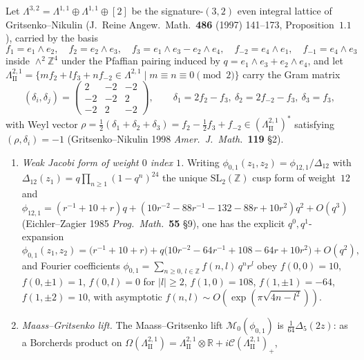 \begin{lemma}[Explicit Fourier data of \texorpdfstring{$\phi_{0,1}$}{phi-0,1}, imaginary-odd multiplicities \texorpdfstring{$m(a)$}{m(a)}, and the \texorpdfstring{$\tau(a_0)=9$}{tau(a-0)=9} cusp signature at the three \texorpdfstring{$0$}{0}-dimensional cusps]
\label{lem:k3e-cy3-phi01-tau9-multiplicities}
Let $\Lambda^{3,2} = \Lambda^{1,1}\oplus\Lambda^{1,1}\oplus[2]$ be the signature-$(3,2)$ even integral lattice of Gritsenko--Nikulin \textup{(}J.~Reine Angew.\ Math.~\textbf{486} (1997) 141--173, Proposition~$1.1$\textup{)}, carried by the basis
\[
 f_1 = e_1\wedge e_2,\quad f_2 = e_2\wedge e_3,\quad f_3 = e_1\wedge e_3 - e_2\wedge e_4,\quad f_{-2} = e_4\wedge e_1,\quad f_{-1} = e_4\wedge e_3
\]
inside $\wedge^2\mathbb Z^4$ under the Pfaffian pairing induced by $q = e_1\wedge e_3 + e_2\wedge e_4$, and let $\Lambda^{2,1}_{\mathrm{II}} = \{m f_2 + l f_3 + n f_{-2}\in\Lambda^{2,1}\mid m\equiv n\equiv 0\pmod 2\}$ carry the Gram matrix
\[
 (\delta_i,\delta_j) = \begin{pmatrix} 2 & -2 & -2\\ -2 & -2 & 2\\ -2 & 2 & -2\end{pmatrix},\qquad \delta_1 = 2f_2 - f_3,\ \delta_2 = 2f_{-2} - f_3,\ \delta_3 = f_3,
\]
with Weyl vector $\rho = \tfrac12(\delta_1+\delta_2+\delta_3) = f_2 - \tfrac12 f_3 + f_{-2}\in(\Lambda^{2,1}_{\mathrm{II}})^{*}$ satisfying $(\rho,\delta_i) = -1$ \textup{(}Gritsenko--Nikulin 1998 \emph{Amer.\ J.\ Math.}~\textbf{119} \S 2\textup{)}.
\begin{enumerate}[label=\textup{(\roman*)},leftmargin=1.5em]
\item \emph{Weak Jacobi form of weight $0$ index $1$.} Writing $\phi_{0,1}(z_1,z_2) = \phi_{12,1}/\Delta_{12}$ with $\Delta_{12}(z_1) = q\prod_{n\geq 1}(1-q^n)^{24}$ the unique $\mathrm{SL}_2(\mathbb Z)$ cusp form of weight~$12$ and $\phi_{12,1} = (r^{-1}+10+r)q + (10r^{-2} - 88r^{-1} - 132 - 88r + 10r^2)q^2 + O(q^3)$ \textup{(}Eichler--Zagier 1985 \emph{Prog.\ Math.}~\textbf{55} \S 9\textup{)}, one has the explicit $q^0,q^1$-expansion
\[
 \phi_{0,1}(z_1,z_2) = \bigl(r^{-1}+10+r\bigr) + q\bigl(10 r^{-2} - 64 r^{-1} + 108 - 64 r + 10 r^{2}\bigr) + O(q^2),
\]
and Fourier coefficients $\phi_{0,1} = \sum_{n\geq 0,\,l\in\mathbb Z}f(n,l)\,q^n r^l$ obey $f(0,0)=10$, $f(0,\pm 1)=1$, $f(0,l)=0$ for $|l|\geq 2$, $f(1,0)=108$, $f(1,\pm 1) = -64$, $f(1,\pm 2)=10$, with asymptotic $f(n,l)\sim O(\exp(\pi\sqrt{4n-l^2}))$.
\item \emph{Maass--Gritsenko lift.} The Maass--Gritsenko lift $\mathcal M_0(\phi_{0,1})$ is $\tfrac{1}{64}\Delta_5(2z)$: as a Borcherds product on $\Omega(\Lambda^{2,1}_{\mathrm{II}}) = \Lambda^{2,1}_{\mathrm{II}}\otimes\mathbb R + i\mathcal C(\Lambda^{2,1}_{\mathrm{II}})_+$,

\end{enumerate}
\end{lemma}
